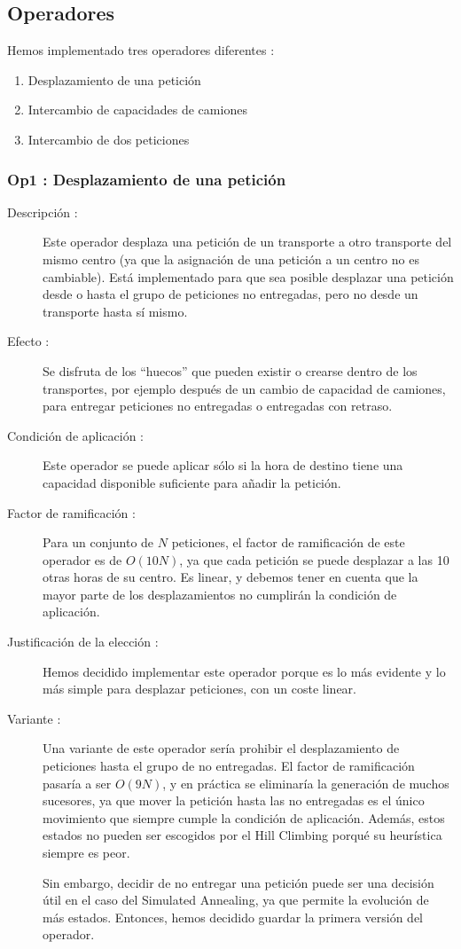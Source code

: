 \documentclass{article}
\begin{document}
\subsection{Operadores}

Hemos implementado tres operadores diferentes :
\begin{enumerate}
\item Desplazamiento de una petición
\item Intercambio de capacidades de camiones
\item Intercambio de dos peticiones
\end{enumerate}

\subsubsection{Op1 : Desplazamiento de una petición}

\begin{description}
\item[Descripción :] Este operador desplaza una petición de un transporte a
otro transporte del mismo centro (ya que la asignación de una petición a un
centro no es cambiable). Está implementado para que sea posible desplazar una
petición desde o hasta el grupo de peticiones no entregadas, pero no desde un
transporte hasta sí mismo.
\item[Efecto :] Se disfruta de los ``huecos'' que pueden existir o crearse
dentro de los transportes, por ejemplo después de un cambio de capacidad de
camiones, para entregar peticiones no entregadas o entregadas con retraso.
\item[Condición de aplicación :] Este operador se puede aplicar sólo si la
hora de destino tiene una capacidad disponible suficiente para añadir la
petición.
\item[Factor de ramificación :] Para un conjunto de $N$ peticiones, el factor de
ramificación de este operador es de $O(10N)$, ya que cada petición se puede
desplazar a las 10 otras horas de su centro. Es linear, y debemos tener en
cuenta que la mayor parte de los desplazamientos no cumplirán la condición de
aplicación.
\item[Justificación de la elección :]
Hemos decidido implementar este operador porque es lo más evidente y lo más 
simple para desplazar peticiones, con un coste linear.
\item[Variante :] Una variante de este operador sería prohibir el desplazamiento
de peticiones hasta el grupo de no entregadas. El factor de ramificación pasaría
a ser $O(9N)$, y en práctica se eliminaría la generación de muchos sucesores,
ya que mover la petición hasta las no entregadas es el único movimiento que
siempre cumple la condición de aplicación. Además, estos estados no pueden ser
escogidos por el Hill Climbing porqué su heurística siempre es peor.

Sin embargo, decidir de no entregar una petición puede ser una decisión útil en
el caso del Simulated Annealing, ya que permite la evolución de más estados.
Entonces, hemos decidido guardar la primera versión del operador.
\end{description}
\end{document}
